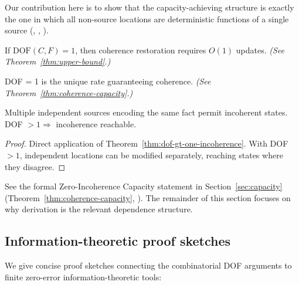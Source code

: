 Our contribution here is to show that the capacity-achieving structure is exactly the one in which all non-source locations are deterministic functions of a single source (, , ).

\begin{corollary}[DOF = 1 Achieves $O(1)$ Update]\label{thm:ssot-optimal}
If $\text{DOF}(C, F) = 1$, then coherence restoration requires $O(1)$ updates. \emph{(See Theorem~\ref{thm:upper-bound}.)}
\end{corollary}

\begin{corollary}\label{thm:ssot-unique}
DOF = 1 is the unique rate guaranteeing coherence. \emph{(See Theorem~\ref{thm:coherence-capacity}.)}
\end{corollary}

\begin{corollary}\label{cor:no-redundancy}
Multiple independent sources encoding the same fact permit incoherent states. DOF $> 1 \Rightarrow$ incoherence reachable.
\end{corollary}

\begin{proof}
Direct application of Theorem~\ref{thm:dof-gt-one-incoherence}. With DOF $> 1$, independent locations can be modified separately, reaching states where they disagree.
\end{proof}
See the formal Zero-Incoherence Capacity statement in Section~\ref{sec:capacity} (Theorem~\ref{thm:coherence-capacity}, ). The remainder of this section focuses on why derivation is the relevant dependence structure.

\subsection{Information-theoretic proof sketches}
\label{sec:info-sketches}

We give concise proof sketches connecting the combinatorial DOF arguments to finite zero-error information-theoretic tools:

